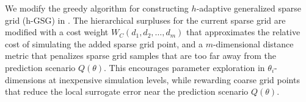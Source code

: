 We modify the 
greedy algorithm for constructing $h$-adaptive generalized sparse grid (h-GSG) in \cite{Jakeman2011LocalAD}.
The hierarchical surpluses for the current sparse grid are modified with a cost weight $W_C(d_1,d_2,\ldots,d_m)$ that approximates the relative
cost of simulating the added sparse grid point, and a $m$-dimensional distance metric that penalizes sparse grid
samples that are too far away from the prediction scenario $Q(\theta)$.  This encourages parameter exploration in $\theta_i$-dimensions at
inexpensive simulation levels, while rewarding coarse grid points that reduce the local surrogate error near the prediction scenario $Q(\theta)$.  


 


 
